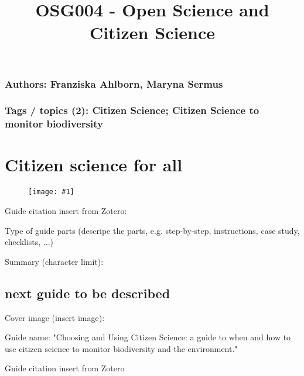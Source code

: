 \documentclass{article}
\newlength{\imgwidth}
\newcommand\scaledgraphics[2]{%
                
\settowidth{\imgwidth}{\texttt{[image: \#1]}}%
                
\setlength{\imgwidth}{\minof{\imgwidth}{#2\textwidth}}%
                
\texttt{[image: \#1]}%
                
}
\begin{document}
\title{OSG004 - Open Science and Citizen Science}

\maketitle





\subsubsection{\textbf{Authors: Franziska Ahlborn, Maryna Sermus}}\label{H1731420}



\subsubsection{\textbf{Tags / topics (2): Citizen Science; Citizen Science to monitor biodiversity}}\label{H5470699}



\section{Citizen science for all}\label{H2662301}



\begin{center}
\begin{figure}
\scaledgraphics{3cbbd8ed-7495-46a8-8cb5-114cf95cfb83.png}{0.25}
\label{F38618731}
\end{figure}


\end{center}


Guide citation insert from Zotero: \autocite{noauthor_citizen_2016}


Type of guide parts (descripe the parts, e.g. step-by-step, instructions, case study, checklists, ...)


Summary (character limit): 








\subsection{next guide to be described}\label{H7212092}



Cover image (insert image):


Guide name: "Choosing and Using Citizen Science: a guide to when and how to use citizen science to monitor biodiversity and the environment."


Guide citation insert from Zotero \autocite{pocock_choosing_2014}  


\printbibliography[title={Literaturverzeichnis}]
\end{document}
